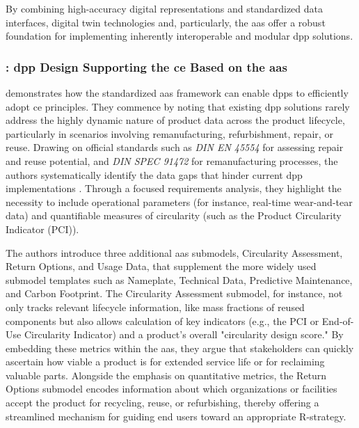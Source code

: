 By combining high-accuracy digital representations and standardized data interfaces, digital twin technologies and, particularly, the \ac{aas} offer a robust foundation for implementing inherently interoperable and modular \ac{dpp} solutions.

\subsubsection*{\textcite{Kuhn.2025}: \ac{dpp} Design Supporting the \acrlong{ce} Based on the \ac{aas}}
\textcite{Kuhn.2025} demonstrates how the standardized \ac{aas} framework can enable \ac{dpp}s to efficiently adopt \acrlong{ce} principles. They commence by noting that existing \ac{dpp} solutions rarely address the highly dynamic nature of product data across the product lifecycle, particularly in scenarios involving remanufacturing, refurbishment, repair, or reuse. Drawing on official standards such as \textit{DIN EN 45554} for assessing repair and reuse potential, and \textit{DIN SPEC 91472} for remanufacturing processes, the authors systematically identify the data gaps that hinder current \ac{dpp} implementations \autocite{DeutschesInstitutfurNormunge.V..2020, DeutschesInstitutfurNormunge.V..2023}. Through a focused requirements analysis, they highlight the necessity to include operational parameters (for instance, real-time wear-and-tear data) and quantifiable measures of circularity (such as the Product Circularity Indicator (PCI)).

The authors introduce three additional \ac{aas} submodels, Circularity Assessment, Return Options, and Usage Data, that supplement the more widely used submodel templates such as Nameplate, Technical Data, Predictive Maintenance, and Carbon Footprint. The Circularity Assessment submodel, for instance, not only tracks relevant lifecycle information, like mass fractions of reused components but also allows calculation of key indicators (e.g., the PCI or End-of-Use Circularity Indicator) and a product’s overall "circularity design score." By embedding these metrics within the \ac{aas}, they argue that stakeholders can quickly ascertain how viable a product is for extended service life or for reclaiming valuable parts. Alongside the emphasis on quantitative metrics, the Return Options submodel encodes information about which organizations or facilities accept the product for recycling, reuse, or refurbishing, thereby offering a streamlined mechanism for guiding end users toward an appropriate R-strategy. \autocite{Kuhn.2025}

